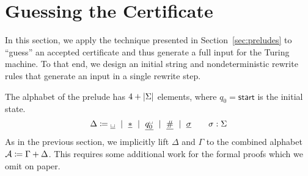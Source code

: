 \section{Guessing the Certificate}
In this section, we apply the technique presented in Section~\ref{sec:preludes} to ``guess'' an accepted certificate and thus generate a full input for the Turing machine. To that end, we design an initial string and nondeterministic rewrite rules that generate an input in a single rewrite step.

\newcommand{\nblank}{\ensuremath{\underline{\blank}}}
\newcommand{\ndelim}{\ensuremath{\underline{\#}}}
\newcommand{\nstar}{\ensuremath{\underline{*}}}
\newcommand{\ninit}{\ensuremath{\underline{q_0^{\blank}}}}
\newcommand{\nsig}[1]{\ensuremath{\underline{#1}}}

\newcommand{\initStr}{\textsf{initStr}}
\newcommand{\Rprelude}{\ensuremath{R_{\text{prelude}}}}

The alphabet \mnotec{$\Delta$} of the prelude has $4 + |\Sigma|$ elements, where $q_0 = \textsf{start}$ is the initial state.
\[\Delta \defeq \nblank \bnfmid \nstar \bnfmid \ninit \bnfmid \ndelim \bnfmid \nsig{\sigma} \qquad \sigma : \Sigma\]
As in the previous section, we implicitly lift $\Delta$ and $\Gamma$ to the combined alphabet $\mathcal{A}\coloneqq \Gamma + \Delta$. This requires some additional work for the formal proofs which we omit on paper.

